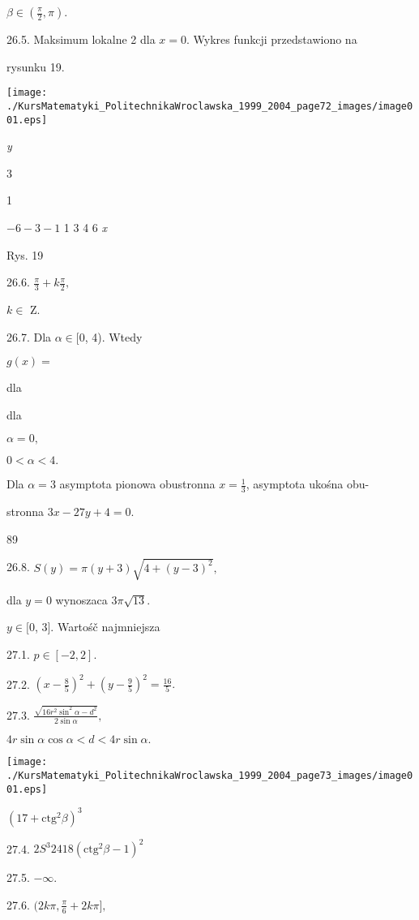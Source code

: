 \documentclass[a4paper,12pt]{article}
\begin{document}
$\beta\in (\displaystyle \frac{\pi}{2},\pi).$

26.5. Maksimum lokalne 2 dla $x=0$. Wykres funkcji przedstawiono na

rysunku 19.
\begin{center}
\texttt{[image: ./KursMatematyki\_PolitechnikaWroclawska\_1999\_2004\_page72\_images/image001.eps]}
\end{center}
{\it y}

3

1

$-6  -3  -1$  1 3 4  6 {\it x}

Rys. 19

26.6. $\displaystyle \frac{\pi}{3}+k\frac{\pi}{2},$

$ k\in$ Z.

26.7. Dla $\alpha\in[0$, 4). Wtedy

$g(x)=$

dla

dla

$\alpha=0,$

$0<\alpha<4.$

Dla $\alpha=3$ asymptota pionowa obustronna $x= \displaystyle \frac{1}{3}$, asymptota ukośna obu-

stronna $3x-27y+4=0.$





89

26.8. $S(y)=\pi(y+3)\sqrt{4+(y-3)^{2}},$

dla $y=0$ wynoszaca $3\pi\sqrt{13}.$

$ y\in [0$, 3$]$. Wartośč najmniejsza

27.1. $p\in[-2,2].$

27.2. $(x-\displaystyle \frac{8}{5})^{2}+(y-\frac{9}{5})^{2}=\frac{16}{5}.$

27.3. $\displaystyle \frac{\sqrt{16r^{2}\sin^{2}\alpha-d^{2}}}{2\sin\alpha},$

$4r\sin\alpha\cos\alpha<d<4r\sin\alpha.$
\begin{center}
\texttt{[image: ./KursMatematyki\_PolitechnikaWroclawska\_1999\_2004\_page73\_images/image001.eps]}
\end{center}
$(17+\mathrm{c}\mathrm{t}\mathrm{g}^{2}\beta)^{3}$

27.4. $2S^{3}24 18(\mathrm{c}\mathrm{t}\mathrm{g}^{2}\beta-1)^{2}$

27.5. $-\infty.$

27.6. $(2k\displaystyle \pi,\frac{\pi}{6}+2k\pi],$
\end{document}
